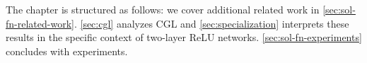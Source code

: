 The chapter is structured as follows: 
we cover additional related work in \cref{sec:sol-fn-related-work}.
\cref{sec:cgl} analyzes CGL and \cref{sec:specialization} interprets these
results in the specific context of two-layer ReLU networks.
\cref{sec:sol-fn-experiments} concludes with experiments.
